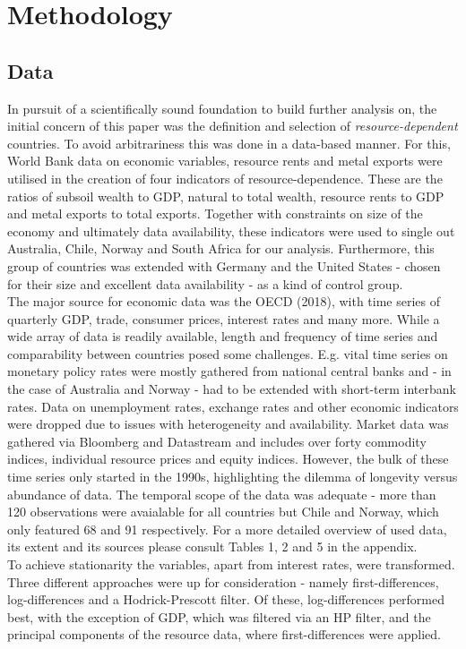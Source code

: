 \documentclass[12pt,]{article}
\begin{document}
\section{Methodology}\label{methodology}

\subsection{Data}\label{data}

In pursuit of a scientifically sound foundation to build further
analysis on, the initial concern of this paper was the definition and
selection of \emph{resource-dependent} countries. To avoid arbitrariness
this was done in a data-based manner. For this, World Bank data on
economic variables, resource rents and metal exports were utilised in
the creation of four indicators of resource-dependence. These are the
ratios of subsoil wealth to GDP, natural to total wealth, resource rents
to GDP and metal exports to total exports. Together with constraints on
size of the economy and ultimately data availability, these indicators
were used to single out Australia, Chile, Norway and South Africa for
our analysis. Furthermore, this group of countries was extended with
Germany and the United States - chosen for their size and excellent data
availability - as a kind of control group.\\
The major source for economic data was the OECD (2018), with time series
of quarterly GDP, trade, consumer prices, interest rates and many more.
While a wide array of data is readily available, length and frequency of
time series and comparability between countries posed some challenges.
E.g. vital time series on monetary policy rates were mostly gathered
from national central banks and - in the case of Australia and Norway -
had to be extended with short-term interbank rates. Data on unemployment
rates, exchange rates and other economic indicators were dropped due to
issues with heterogeneity and availability. Market data was gathered via
Bloomberg and Datastream and includes over forty commodity indices,
individual resource prices and equity indices. However, the bulk of
these time series only started in the 1990s, highlighting the dilemma of
longevity versus abundance of data. The temporal scope of the data was
adequate - more than 120 observations were avaialable for all countries
but Chile and Norway, which only featured 68 and 91 respectively. For a
more detailed overview of used data, its extent and its sources please
consult Tables 1, 2 and 5 in the appendix.\\
To achieve stationarity the variables, apart from interest rates, were
transformed. Three different approaches were up for consideration -
namely first-differences, log-differences and a Hodrick-Prescott filter.
Of these, log-differences performed best, with the exception of GDP,
which was filtered via an HP filter, and the principal components of the
resource data, where first-differences were applied.
\end{document}
